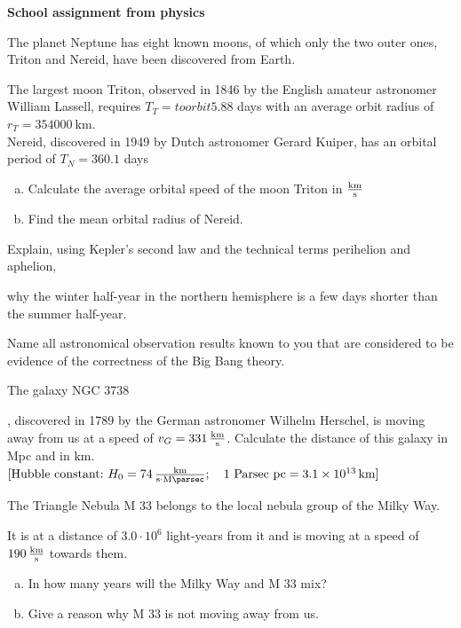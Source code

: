 \documentclass[a4paper]{article}
\begin{document}
	{\bf School assignment from physics }\\
	\begin{enumerate}[1.]
		
		{\bf \item The planet Neptune has eight known moons, of which only the two outer ones, Triton and Nereid, have been discovered from Earth.} The largest moon Triton, observed in 1846 by the English amateur astronomer William Lassell, requires $T_T= to orbit 5.88$ days with an average orbit radius of $r_T= \SI{354000}{\kilo\meter}$. \\
		Nereid, discovered in 1949 by Dutch astronomer Gerard Kuiper, has an orbital period of $T_N=360.1 $ days
		
		\begin{enumerate}[a)]
			\item Calculate the average orbital speed of the moon Triton in $\SI{}{\kilo\meter\over \second}$
			\item Find the mean orbital radius of Nereid.
		\end{enumerate}
		
		{\bf \item Explain, using Kepler's second law and the technical terms perihelion and aphelion,} why the winter half-year in the northern hemisphere is a few days shorter than the summer half-year.
		
		{\bf \item Name all astronomical observation results known to you that are considered to be evidence of the correctness of the Big Bang theory.}
		
		{\bf \item The galaxy NGC 3738}, discovered in 1789 by the German astronomer Wilhelm Herschel, is moving away from us at a speed of $v_G=\SI{331}{\kilo\meter\over \second}$. Calculate the distance of this galaxy in Mpc and in km.\\
		$[\textnormal{Hubble constant:}~H_0=\SI{74}{\kilo\meter\over \second\cdot\mega\parsec}; \quad 1~\textnormal{Parsec~pc}=\SI{3,1e13}{\kilo\meter}]$
		
		{\bf \item The Triangle Nebula M 33 belongs to the local nebula group of the Milky Way.} It is at a distance of $3.0 \cdot 10^6 $ light-years from it and is moving at a speed of $\SI{190}{\kilo \meter\over \second}$ towards them.
		
		\begin{enumerate}[a)]
			\item In how many years will the Milky Way and M 33 mix?
			\item Give a reason why M 33 is not moving away from us.
		\end{enumerate}
		

\end{enumerate}
\end{document}
